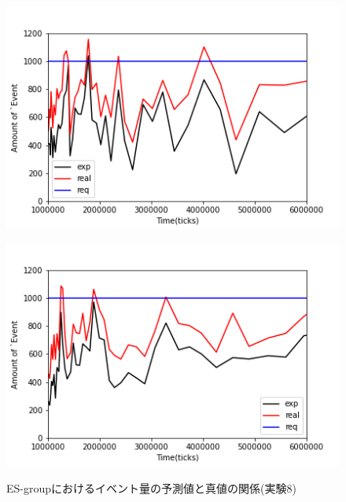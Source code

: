 \documentclass[12pt,a4j,twoside]{jarticle}
\begin{document}
  \begin{figure}
    \begin{minipage}{0.48\hsize}
      \centering
      \includegraphics[width=0.99\hsize]{figures/ExpReal_Complex_ESgroup_0.png}
      \label{subfig:expReal_Complex_ES_0}
    \end{minipage}
    \hfill
    \begin{minipage}{0.48\hsize}
      \centering
      \includegraphics[width=0.99\hsize]{figures/ExpReal_Complex_ESgroup_3.png}
      \label{subfig:expReal_Complex_ES_3}
    \end{minipage}
    \caption{ES-groupにおけるイベント量の予測値と真値の関係(実験8)}
    \label{fig:expReal_Complex_ES}
  \end{figure}
\end{document}
